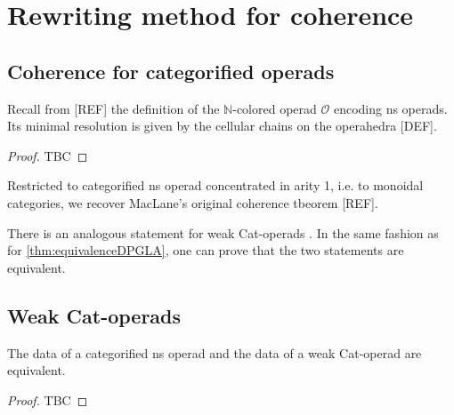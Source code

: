
\section{Rewriting method for coherence} 
\label{s:catoperads}







\subsection{Coherence for categorified operads}

Recall from [REF] the definition of the $\mathbb{N}$-colored operad $\mathcal{O}$ encoding ns operads. Its minimal resolution is given by the cellular chains on the operahedra [DEF]. 


\begin{thm} 
\end{thm}

\begin{proof} TBC
\end{proof}

Restricted to categorified ns operad concentrated in arity 1, i.e. to monoidal categories, we recover MacLane's original coherence tbeorem [REF].

There is an analogous statement for weak Cat-operads \cite[Proposition 14.2]{DP15}. In the same fashion as for \cref{thm:equivalenceDPGLA}, one can prove that the two statements are equivalent. 


\subsection{Weak Cat-operads}

\begin{definition}
\end{definition}

\begin{thm} \label{thm:equivalenceDPGLA}
    The data of a categorified ns operad and the data of a weak Cat-operad are equivalent.  
\end{thm}

\begin{proof}
    TBC
\end{proof}



